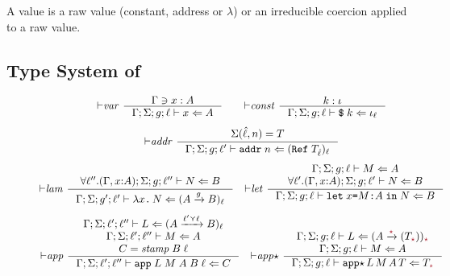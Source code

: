 A value is a raw value (constant, address or $\lambda$) or an
irreducible coercion applied to a raw value.

\subsection{Type System of \CC}
\label{sec:cc-typing}

\begin{figure}[tbp]
\raggedright
  {\small
  \begin{gather*}
    {\vdash}\mathit{var} ~
    \inference{\Gamma \ni x : A}
              {\Gamma; \Sigma; g; \ell \vdash x \Leftarrow A}
    \qquad
    {\vdash}\mathit{const} ~
    \inference{k : \iota}
              {\Gamma; \Sigma; g; \ell \vdash \ccconst{k} \Leftarrow \iota_\ell}
    \\[1ex]
    {\vdash}\mathit{addr} ~
    \inference{\Sigma(\hat{\ell}, n) = T}
              {\Gamma; \Sigma; g; \ell' \vdash \ccaddr{n} \Leftarrow (\Refer{T_{\hat{\ell}}})_\ell}
    \\[1ex]
    {\vdash}\mathit{lam} ~
    \inference{\forall \ell'' . (\Gamma , x{:}A); \Sigma; g; \ell'' \vdash N \Leftarrow B}
              {\Gamma; \Sigma; g'; \ell' \vdash \cclam{x}{N} \Leftarrow (\Fun{A}{g}{B})_\ell}
    \quad
    {\vdash}\mathit{let} ~
    \inference{\Gamma; \Sigma; g; \ell \vdash M \Leftarrow A \\
               \forall \ell' . (\Gamma, x{:}A); \Sigma; g; \ell' \vdash N \Leftarrow B}
              {\Gamma; \Sigma; g; \ell \vdash \cclet{x}{M}{A}{N} \Leftarrow B}
    \\[1ex]
    {\vdash}\mathit{app} ~
    \inference{\Gamma; \Sigma; \ell'; \ell'' \vdash L \Leftarrow (\Fun{A}{\ell' \curlyvee \ell}{B})_{\ell} \\
               \Gamma; \Sigma; \ell'; \ell'' \vdash M \Leftarrow A \\
               C = \mathit{stamp} \; B \; \ell}
              {\Gamma; \Sigma; \ell'; \ell'' \vdash \ccapp{L}{M}{A}{B}{\ell} \Leftarrow C}
    \quad
    {\vdash}\mathit{app}{\star}~
    \inference{\Gamma; \Sigma; g; \ell \vdash L \Leftarrow (\Fun{A}{\unk}{(T_{\unk})})_{\unk} \\
               \Gamma; \Sigma; g; \ell \vdash M \Leftarrow A \\
               }
              {\Gamma; \Sigma; g; \ell \vdash \ccappstar{L}{M}{A}{T} \Leftarrow T_{\unk}}
    \\[1ex]

\end{gather*}}
\end{figure}
